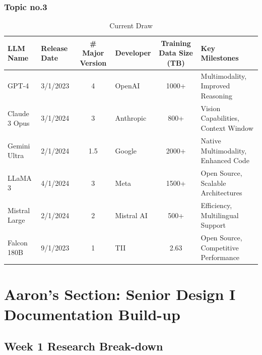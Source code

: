 \documentclass[11pt,letterpaper]{article}
\begin{document}
\subsubsection{Topic no.3}
\begin{table}[H]
\fontsize{11}{11}\selectfont
\centering
\caption*{Current Draw}
\vspace{-7pt}
\begin{tabularx}{\textwidth}{l|l|c|l|c|X}
\toprule
\textbf{LLM Name} & \textbf{Release Date} & \textbf{\# Major Version} & \textbf{Developer} & \textbf{Training Data Size (TB)} & \textbf{Key Milestones} \\
\midrule
GPT-4 & 3/1/2023 & 4 & OpenAI & 1000+ & Multimodality, Improved Reasoning \\
Claude 3 Opus & 3/1/2024 & 3 & Anthropic & 800+ & Vision Capabilities, Context Window \\
Gemini Ultra & 2/1/2024 & 1.5 & Google & 2000+ & Native Multimodality, Enhanced Code \\
LLaMA 3 & 4/1/2024 & 3 & Meta & 1500+ & Open Source, Scalable Architectures \\
Mistral Large & 2/1/2024 & 2 & Mistral AI & 500+ & Efficiency, Multilingual Support \\
Falcon 180B & 9/1/2023 & 1 & TII & 2.63 & Open Source, Competitive Performance \\
\midrule
\bottomrule
\end{tabularx}
\end{table}
\newpage

\section{Aaron's Section: Senior Design I Documentation Build-up}
\subsection{Week 1 Research Break-down}
\end{document}

